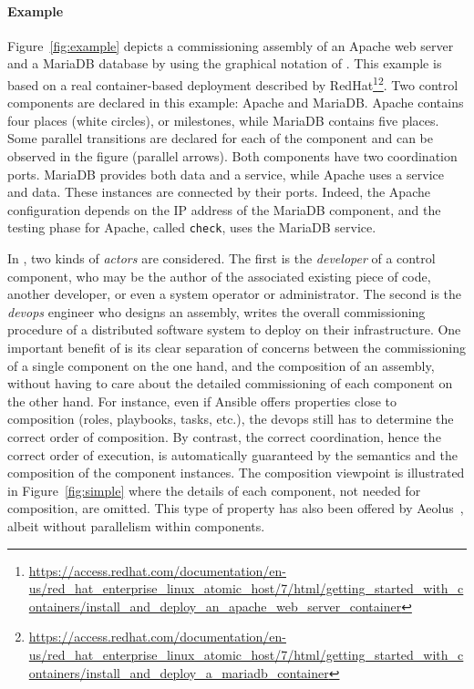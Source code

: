 \paragraph{Example}{
	Figure~\ref{fig:example} depicts a \mad commissioning assembly of an Apache 
	web server and a MariaDB database by using the graphical notation of \mad. 
	This example is based on a real container-based deployment described by 
	RedHat\footnote{\url{https://access.redhat.com/documentation/en-us/red_hat_enterprise_linux_atomic_host/7/html/getting_started_with_containers/install_and_deploy_an_apache_web_server_container}}\footnote{\url{https://access.redhat.com/documentation/en-us/red_hat_enterprise_linux_atomic_host/7/html/getting_started_with_containers/install_and_deploy_a_mariadb_container}}.
	 Two \mad control components are declared in this example: Apache and MariaDB. 
	Apache contains four places (white circles), or milestones, while MariaDB 
	contains five places. Some parallel transitions are declared for each of the 
	component and can be observed in the figure (parallel arrows). Both components 
	have two coordination ports. MariaDB provides both data and a service, while 
	Apache uses a service and data. These instances are connected by their ports. 
	Indeed, the Apache configuration depends on the IP address of the MariaDB 
	component, and the testing phase for Apache, called \texttt{check}, uses the 
	MariaDB service.
} %

In \mad, two kinds of \emph{actors} are considered. The first is the \emph{developer} of a control component, who may be the author of the associated existing piece of code, another developer, or even a system operator or administrator. The second is the \emph{devops} engineer who designs an assembly, \ie writes the overall commissioning procedure of a distributed software system to deploy on their infrastructure. One important benefit of \mad is its clear separation of concerns between the commissioning of a single component on the one hand, and the composition of an assembly, without having to care about the detailed commissioning of each component on the other hand. For instance, even if Ansible offers properties close to composition (\eg roles, playbooks, tasks, etc.), the devops still has to determine the correct order of composition. By contrast, the correct coordination, hence the correct order of execution, is automatically guaranteed by the \mad semantics and the composition of the component instances. The composition viewpoint is illustrated in Figure~\ref{fig:simple} where the details of each component, not needed for composition, are omitted. This type of property has also been offered by Aeolus~\cite{dicosmo2014ic}, albeit without parallelism within components.

